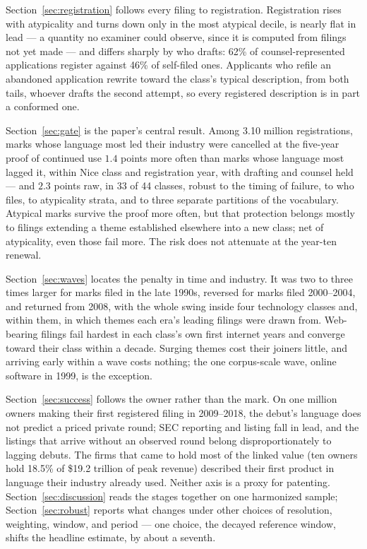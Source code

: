 Section~\ref{sec:registration} follows every filing to registration.
Registration rises with atypicality and turns down only in the most
atypical decile, is nearly flat in lead --- a quantity no examiner could
observe, since it is computed from filings not yet made --- and differs
sharply by who drafts: 62\% of counsel-represented applications register
against 46\% of self-filed ones. Applicants who refile an abandoned
application rewrite toward the class's typical description, from both
tails, whoever drafts the second attempt, so every registered description
is in part a conformed one.

Section~\ref{sec:gate} is the paper's central result. Among 3.10 million
registrations, marks whose language most led their industry were cancelled
at the five-year proof of continued use $1.4$ points more often than marks
whose language most lagged it, within Nice class and registration year,
with drafting and counsel held --- and $2.3$ points raw, in 33 of 44
classes, robust to the timing of failure, to who files, to atypicality
strata, and to three separate partitions of the vocabulary. Atypical
marks survive the proof more often, but that protection belongs mostly to
filings extending a theme established elsewhere into a new class; net of
atypicality, even those fail more. The risk does not attenuate at the
year-ten renewal.

Section~\ref{sec:waves} locates the penalty in time and industry. It was
two to three times larger for marks filed in the late 1990s, reversed for
marks filed 2000--2004, and returned from 2008, with the whole swing
inside four technology classes and, within them, in which themes each
era's leading filings were drawn from. Web-bearing filings fail hardest in
each class's own first internet years and converge toward their class
within a decade. Surging themes cost their joiners little, and arriving
early within a wave costs nothing; the one corpus-scale wave, online
software in 1999, is the exception.

Section~\ref{sec:success} follows the owner rather than the mark. On one
million owners making their first registered filing in 2009--2018, the
debut's language does not predict a priced private round; SEC reporting
and listing fall in lead, and the listings that arrive without an observed
round belong disproportionately to lagging debuts. The firms that came to
hold most of the linked value (ten owners hold 18.5\% of \$19.2 trillion
of peak revenue) described their first product in language their industry
already used. Neither axis is a proxy for patenting.
Section~\ref{sec:discussion} reads the stages together on one harmonized
sample; Section~\ref{sec:robust} reports what changes under other
choices of resolution, weighting, window, and period --- one choice, the
decayed reference window, shifts the headline estimate, by about a
seventh.

